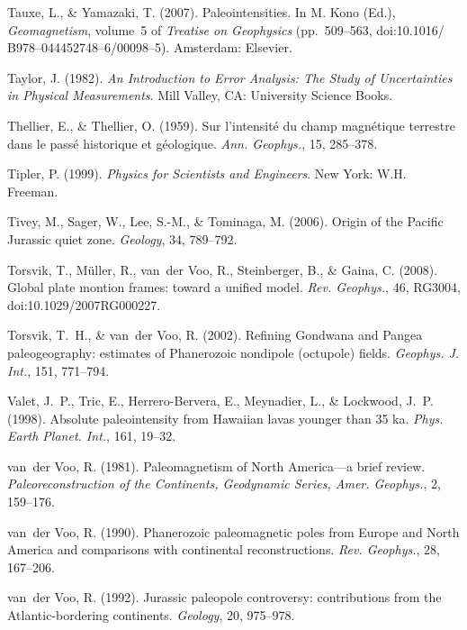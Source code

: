 \documentclass[,plain]{tauxe}
\begin{document}
\begin{thebibliography}{}
\bibitem{}%
Tauxe, L., \& Yamazaki, T. (2007).
Paleointensities.
In M. Kono (Ed.), {\it Geomagnetism}, volume~5 of {\it Treatise on
Geophysics} (pp.\ 509--563, doi:10.1016/ B978--044452748--6/00098--5). Amsterdam: Elsevier.

\bibitem{}%
Taylor, J. (1982).
{\it An Introduction to Error Analysis: The Study of Uncertainties in Physical Measurements}.
Mill Valley, CA: University Science Books.

\bibitem{}%
Thellier, E., \& Thellier, O. (1959).
Sur l'intensit\' e du champ magn\' etique terrestre dans le pass\' e historique et g\' eologique.
{\it Ann. Geophys.}, 15, 285--378.

\bibitem{}%
Tipler, P. (1999).
{\it Physics for Scientists and Engineers}.
New York: W.H. Freeman.

\bibitem{}%
Tivey, M., Sager, W., Lee, S.-M., \& Tominaga, M. (2006).
Origin of the Pacific Jurassic quiet zone.
{\it Geology}, 34, 789--792.

\bibitem{}%
Torsvik, T., M\"uller, R., van~der Voo, R., Steinberger, B., \& Gaina, C. (2008).
Global plate montion frames: toward a unified model.
{\it Rev. Geophys.}, 46, RG3004, doi:10.1029/2007RG000227.

\bibitem{}%
Torsvik, T.~H., \& van~der Voo, R. (2002).
Refining Gondwana and Pangea paleogeography: estimates of Phanerozoic nondipole (octupole) fields.
{\it Geophys. J. Int.}, 151, 771--794.

\bibitem{}%
Valet, J.~P., Tric, E., Herrero-Bervera, E., Meynadier, L., \& Lockwood, J.~P. (1998).
Absolute paleointensity from Hawaiian lavas younger than 35 ka.
{\it Phys. Earth Planet. Int.}, 161, 19--32.

\bibitem{}%
van~der Voo, R. (1981).
Paleomagnetism of North America---a brief review.
{\it Paleoreconstruction of the Continents, Geodynamic Series, Amer. Geophys.}, 2, 159--176.

\bibitem{}%
van~der Voo, R. (1990).
Phanerozoic paleomagnetic poles from Europe and North America and comparisons with continental reconstructions.
{\it Rev. Geophys.}, 28, 167--206.

\bibitem{}%
van~der Voo, R. (1992).
Jurassic paleopole controversy: contributions from the Atlantic-bordering continents.
{\it Geology}, 20, 975--978.


\end{thebibliography}
\end{document}
